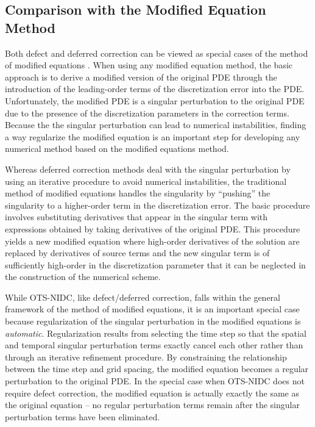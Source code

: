 \documentclass[fleqn,12pt,twoside]{article}
\begin{document}
\subsection{Comparison with the Modified Equation Method}
Both defect and deferred correction can be viewed as special cases of the
method of modified equations \cite{griffiths_1986}.  When using any modified
equation method, the basic approach is to derive a modified version of the 
original PDE through the introduction of the leading-order terms of the
discretization error into the PDE.  Unfortunately, the modified PDE is a
singular perturbation to the original PDE due to the presence of the
discretization parameters in the correction terms.  Because the the singular
perturbation can lead to numerical instabilities, finding a way regularize
the modified equation is an important step for developing any numerical method
based on the modified equations method. 

Whereas deferred correction methods deal with the singular perturbation by
using an iterative procedure to avoid numerical instabilities, the traditional
method of modified equations \cite{griffiths_1986} handles the
singularity by ``pushing'' the singularity to a higher-order term in the
discretization error.  The basic procedure involves substituting derivatives
that appear in the singular term with expressions obtained by taking
derivatives of the original PDE.  This procedure yields a new modified
equation where high-order derivatives of the solution are replaced by
derivatives of source terms and the new singular term is of sufficiently
high-order in the discretization parameter that it can be neglected in the
construction of the numerical scheme.

While OTS-NIDC, like defect/deferred correction, falls within the general
framework of the method of modified equations, it is an important special
case because regularization of the singular perturbation in the modified
equations is \emph{automatic}.  Regularization results from selecting the time
step so that the spatial and temporal singular perturbation terms exactly
cancel each other rather than through an iterative refinement procedure.
By constraining the relationship between the time step and grid spacing, the
modified equation becomes a regular perturbation to the original PDE.  In the
special case when OTS-NIDC does not require defect correction, the modified
equation is actually exactly the same as the original equation -- no regular
perturbation terms remain after the singular perturbation terms have been
eliminated.
\end{document}

